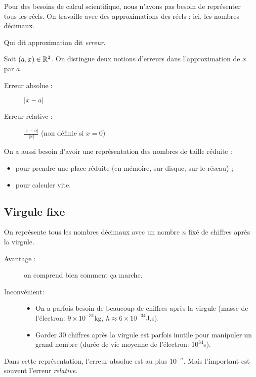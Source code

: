 Pour des besoins de calcul scientifique, nous n'avons pas besoin de représenter tous les réels. On travaille avec des approximations des réels : ici, les nombres décimaux.
\begin{rem}
  Qui dit approximation dit \emph{erreur}.
\end{rem}
\begin{defi}
Soit $(a,x)\in\mathbb{R}^2$. On distingue deux notions d'erreurs dans l'approximation de $x$ par $a$.
\begin{description}
\item[Erreur absolue :] $|x-a|$ 
\item[Erreur relative :]  $\displaystyle\frac{|x-a|}{|x|}$ (non définie si $x=0$)
\end{description}
\end{defi}
On a aussi besoin d'avoir une représentation des nombres de taille réduite :
\begin{itemize}
\item[\textbullet] pour prendre une place réduite (en mémoire, sur disque, sur le réseau) ;
\item[\textbullet] pour calculer vite.
\end{itemize}

\subsection{Virgule fixe}

On représente tous les nombres décimaux avec un nombre $n$ fixé de chiffres après la virgule.

\begin{description}
  \item[Avantage :] on comprend bien comment ça marche. 
  \item[Inconvénient:]
\begin{itemize}
\item[\textbullet] On a parfois besoin de beaucoup de chiffres après la virgule 
(masse de l'électron: $9\times{}10^{-31}$kg, $h\approx 6\times10^{-34}$J.s).
\item[\textbullet] Garder $30$ chiffres après la virgule est parfois inutile pour manipuler
  un grand nombre (durée de vie moyenne de l'électron: $10^{34}$s).
\end{itemize}
\end{description}


Dans cette représentation, l'erreur absolue est au plus $10^{-n}$. Mais l'important est souvent l'erreur \emph{relative}.

